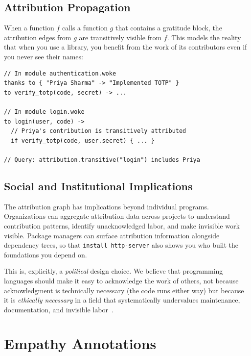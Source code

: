 \documentclass[11pt,a4paper]{article}
\begin{document}
\subsection{Attribution Propagation}

When a function $f$ calls a function $g$ that contains a gratitude
block, the attribution edges from $g$ are transitively visible from
$f$.  This models the reality that when you use a library, you
benefit from the work of its contributors even if you never see their
names:

\begin{lstlisting}[caption={Transitive attribution}]
// In module authentication.woke
thanks to { "Priya Sharma" -> "Implemented TOTP" }
to verify_totp(code, secret) -> ...

// In module login.woke
to login(user, code) ->
  // Priya's contribution is transitively attributed
  if verify_totp(code, user.secret) { ... }

// Query: attribution.transitive("login") includes Priya
\end{lstlisting}

\subsection{Social and Institutional Implications}

The attribution graph has implications beyond individual programs.
Organizations can aggregate attribution data across projects to
understand contribution patterns, identify unacknowledged labor, and
make invisible work visible.  Package managers can surface attribution
information alongside dependency trees, so that \texttt{install
http-server} also shows you who built the foundations you depend on.

This is, explicitly, a \emph{political} design choice.  We believe
that programming languages should make it easy to acknowledge the work
of others, not because acknowledgment is technically necessary (the
code runs either way) but because it is \emph{ethically necessary} in
a field that systematically undervalues maintenance, documentation,
and invisible labor~\citep{star1999ethnography,eghbal2020working}.

\section{Empathy Annotations}
\label{sec:empathy}
\end{document}
